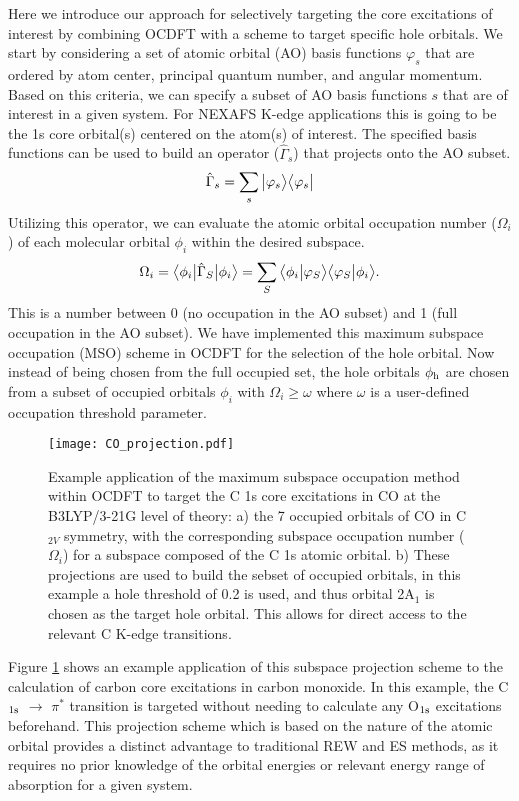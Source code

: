 \documentclass{article}
\begin{document}
Here we introduce our approach for selectively targeting the core excitations of interest by combining OCDFT with a scheme to target specific hole orbitals. We start by considering a set of atomic orbital (AO) basis functions $\varphi_{s}$ that are ordered by atom center, principal quantum number, and angular momentum. Based on this criteria, we can specify a subset of AO basis functions $s$ that are of interest in a given system. For NEXAFS K-edge applications this is going to be the 1s core orbital(s) centered on the atom(s) of interest. The specified basis functions can be used to build an operator ($\hat{\Gamma}_{s}$) that projects onto the AO subset.
\begin{align}
\hat{\Gamma}_{s} = \sum_{s}\ket[1]{\varphi_{s}}\bra[1]{\varphi_{s}}
\end{align}
Utilizing this operator, we can evaluate the atomic orbital occupation number ($\Omega_i$) of each molecular orbital $\phi_i$ within the desired subspace.
\begin{equation}
\Omega_i = \bra[1]{\phi_i} \hat{\Gamma}_{S} \ket[1]{\phi_i} = \sum_{S} \braket[1]{\phi_i}{\varphi_{S}}\braket[1]{\varphi_{S}}{\phi_i}.
\label{eq:proj}
\end{equation}
This is a number between 0 (no occupation in the AO subset) and 1 (full occupation in the AO subset). We have implemented this maximum subspace occupation (MSO) scheme in OCDFT for the selection of the hole orbital. Now instead of being chosen from the full occupied set, the hole orbitals $\phi_{\rm h}$ are chosen from a subset of occupied orbitals $\phi_i$ with $\Omega_i \geq \omega$ where $\omega$ is a user-defined occupation threshold parameter. 
\begin{figure}
\centering
\texttt{[image: CO\_projection.pdf]}
\caption{Example application of the maximum subspace occupation method within OCDFT to target the C 1s core excitations in CO at the B3LYP/3-21G level of theory: a) the 7 occupied orbitals of CO in C$_{2V}$ symmetry, with the corresponding subspace occupation number ($\Omega_i$) for a subspace composed of the C 1s atomic orbital. b) These projections are used to build the sebset of occupied orbitals, in this example a hole threshold of 0.2 is used, and thus orbital 2A$_1$ is chosen as the target hole orbital. This allows for direct access to the relevant C K-edge transitions.}
\label{fig:CO_projection}
\end{figure}
Figure \ref{fig:CO_projection} shows an example application of this subspace projection scheme to the calculation of carbon core excitations in carbon monoxide. In this example, the C$_{\rm 1s}$ $\rightarrow$ $\pi^*$ transition is targeted without needing to calculate any O$_{\rm 1s}$ excitations beforehand. This projection scheme which is based on the nature of the atomic orbital provides a distinct advantage to traditional REW and ES methods, as it requires no prior knowledge of the orbital energies or relevant energy range of absorption for a given system.
\end{document}

